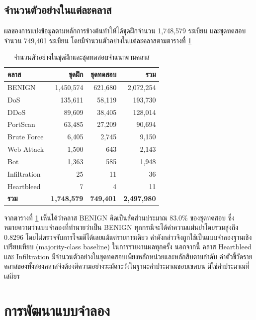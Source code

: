 \subsection{จำนวนตัวอย่างในแต่ละคลาส}

ผลของการแบ่งข้อมูลตามหลักการข้างต้นทำให้ได้ชุดฝึกจำนวน 1,748,579 ระเบียน และชุดทดสอบจำนวน 749,401 ระเบียน โดยมีจำนวนตัวอย่างในแต่ละคลาสตามตารางที่ \ref{tab:class-split}

\begin{table}[ht]
    \caption{จำนวนตัวอย่างในชุดฝึกและชุดทดสอบจำแนกตามคลาส}
    \label{tab:class-split}
    \small
    \begin{tabularx}{\linewidth}{@{}X r r r@{}}
        \hline
        \textbf{คลาส} & \textbf{ชุดฝึก} & \textbf{ชุดทดสอบ} & \textbf{รวม} \\
        \hline
        BENIGN & 1,450,574 & 621,680 & 2,072,254 \\
        DoS & 135,611 & 58,119 & 193,730 \\
        DDoS & 89,609 & 38,405 & 128,014 \\
        PortScan & 63,485 & 27,209 & 90,694 \\
        Brute Force & 6,405 & 2,745 & 9,150 \\
        Web Attack & 1,500 & 643 & 2,143 \\
        Bot & 1,363 & 585 & 1,948 \\
        Infiltration & 25 & 11 & 36 \\
        Heartbleed & 7 & 4 & 11 \\
        \hline
        \textbf{รวม} & \textbf{1,748,579} & \textbf{749,401} & \textbf{2,497,980} \\
        \hline
    \end{tabularx}
\end{table}

จากตารางที่ \ref{tab:class-split} เห็นได้ว่าคลาส BENIGN คิดเป็นสัดส่วนประมาณ 83.0\% ของชุดทดสอบ ซึ่งหมายความว่าแบบจำลองที่ทำนายว่าเป็น BENIGN ทุกกรณีจะได้ค่าความแม่นยำโดยรวมสูงถึง 0.8296 โดยไม่ตรวจจับการโจมตีได้เลยแม้แต่รายการเดียว ค่าดังกล่าวจึงถูกใช้เป็นแบบจำลองฐานเชิงเปรียบเทียบ (majority-class baseline) ในการรายงานผลทุกครั้ง นอกจากนี้ คลาส Heartbleed และ Infiltration มีจำนวนตัวอย่างในชุดทดสอบเพียงหลักหน่วยและหลักสิบตามลำดับ ค่าตัวชี้วัดรายคลาสของทั้งสองคลาสจึงต้องตีความอย่างระมัดระวังในฐานะค่าประมาณขอบเขตบน มิใช่ค่าประมาณที่เสถียร

\section{การพัฒนาแบบจำลอง}

